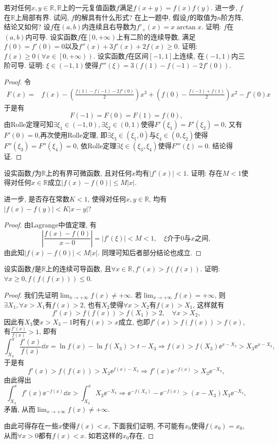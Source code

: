 \begin{quizb}
\woe 若对任何\(x,y\in\mathbb{R},\mathbb{R}\)上的一元复值函数\(f\)满足\(f(x+y)=f(x)f(y)\). 进一步, \(f\)在\(\mathbb{R}\)上局部有界. 试问, \(f\)的解具有什么形式?
\woe 在上一题中, 假设\(f\)的取值为\(n\)阶方阵, 结论又如何?
\woe 设\(f\)在\((a,b)\)内连续且右导数为\(f'_+(x)=x\arctan x\). 证明: \(f\)在\((a,b)\)内可导.
\woe 设实函数\(f\)在\(\left[0,+\infty\right)\)上有二阶的连续导数, 满足\(f(0)=f'(0)=0\)以及\(f''(x)+3f'(x)+2f(x)\geqslant 0\). 证明: \(f(x)\geqslant 0\left(\forall x\in \left[0,+\infty\right)\right)\).
\woe 设实函数\(f\)在区间\([-1,1]\)上连续, 在\((-1,1)\)内三阶可导. 证明: \(\xi\in(-1,1)\)使得\(f'''(\xi)=3\left(f(1)-f(-1)-2f'(0)\right)\).
\begin{proof}
令\[\begin{split}
F(x)=&f(x)-\left(\frac{f(1)-f(-1)-2f'(0)}{2}\right)x^3+\left(f(0)-\frac{f(-1)+f(1)}{2}\right)x^2-f'(0)x
\end{split}\]于是有\[F(-1)=F(0)=F(1)=f(0),\]由Rolle定理可知\(\exists \xi_1\in(-1,0),\exists \xi_2\in(0,1)\)使得\(F'(\xi_1)=F'(\xi_2)=0\), 又有\(F'(0)=0\),再次使用Rolle定理, 即\(\exists \xi_3\in(\xi_1,0)\)与\(\xi_4\in(0,\xi_2)\)使得\(F''(\xi_3)=F''(\xi_4)=0\), 依Rolle定理\(\exists \xi\in(\xi_3,\xi_4)\)使得\(F'''(\xi)=0\). 结论得证.
\end{proof}
\woe 设实函数\(f\)为\(\mathbb{R}\)上的有界可微函数, 且对任何\(x\)均有\(|f'(x)|<1.\) 证明: 存在\(M<1\)使得对任何\(x\in\mathbb{R}\)成立\(|f(x)-f(0)|\leqslant M|x|\).

进一步, 是否存在常数\(K<1\), 使得对任何\(x,y\in\mathbb{R}\), 均有\(|f(x)-f(y)|<K|x-y|\)?
\begin{proof}
由Lagrange中值定理, 有\[\left|\frac{f(x)-f(0)}{x-0}\right|=|f'(\xi)|<M<1,\quad \xi\text{介于\(0\)与\(x\)之间},\]由此知\(|f(x)-f(0)|<M|x|\). 同理可知后者部分结论也成立.
\end{proof}
\woe 设实函数\(f\)是\(\mathbb{R}\)上的连续可导函数, 且\(\forall x\in\mathbb{R}, f'(x)>f\left(f(x)\right)\). 证明: \(\forall x\geqslant 0,f\left(f\left(f(x)\right)\right)\leqslant 0\).
\begin{proof}
我们先证明\(\lim_{x\rightarrow+\infty}f(x)\ne +\infty\). 若\(\lim_{x\rightarrow+\infty}f(x)= +\infty\), 则\(\exists X_1,\forall x>X_1\)有\(f(x)>2\), 也有\(X_2\)使得\(\forall x>X_2\)有\(f(x)>X_1\), 这样就有\[f'(x)>f\left(f(x)\right)>f(X_1)>2,\quad \forall x>X_2,\]因此有\(X_3\)使\(x>X_3-1\)时有\(f(x)>x\)成立, 也即\(f'(x)>f\left(f(x)\right)>f(x)\), 有\(\frac{f'(x)}{f(x)}>1\), 即有\[\int_{X_3}^{x}\frac{f'(x)}{f(x)}\dd x=\ln f(x)-\ln f(X_3)>t-X_3\Rightarrow f(x)>f(X_3)\ee^{x-X_3}>X_3\ee^{x-X_3},\]于是有\[f'(x)>f\left(f(x)\right)>X_3\ee^{f(x)-X_3}\Rightarrow f'(x)\ee^{-f(x)}>X_3\ee^{-X_3},\]由此得出\[\int_{X_3}^{x}f'(x)\ee^{-f(x)}\dd x>\int_{X_3}^{x}X_3\ee^{-X_3}\Rightarrow \ee^{-f(X_3)}-\ee^{-f(x)}>(x-X_3)X_3\ee^{-X_3},\]矛盾, 从而\(\lim_{x\rightarrow+\infty}f(x)\ne +\infty\).

由此可得存在一些\(x\)使得\(f(x)<x\), 下面我们证明, 不可能有\(x_0\)使得\(f(x_0)=x_0\), 从而\(\forall x>0\)都有\(f(x)<x\). 如若这样的\(x_0\)存在,
\end{proof}


\end{quizb}
